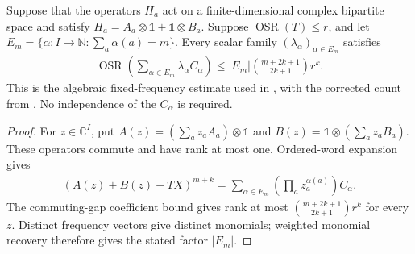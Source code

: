 \begin{theorem}
    \label{thm:one_marker_weighted_rank}
    \leanok
    Suppose that the operators $H_a$ act on a finite-dimensional complex
    bipartite space and satisfy
    $H_a=A_a\otimes\mathbb 1+\mathbb 1\otimes B_a$.
    Suppose $\operatorname{OSR}(T)\le r$, and let
    $E_m=\{\alpha:I\to\mathbb N:\sum_a\alpha(a)=m\}$.
    Every scalar family $(\lambda_\alpha)_{\alpha\in E_m}$ satisfies
    \begin{align*}
        \operatorname{OSR}\!\left(\sum_{\alpha\in E_m}\lambda_\alpha C_\alpha\right)
        \le |E_m|\binom{m+2k+1}{2k+1}r^k.
    \end{align*}
    This is the algebraic fixed-frequency estimate used in
    \cite[Lemma~4.2]{Arad2013AreaLaw}, with the corrected count from
    \cite{gap:aklv13_interpolation_and_word_count}.
    No independence of the $C_\alpha$ is required.
\end{theorem}
\begin{proof}
    \leanok
    For $z\in\mathbb C^I$, put
    $A(z)=(\sum_a z_aA_a)\otimes\mathbb 1$ and
    $B(z)=\mathbb 1\otimes(\sum_a z_aB_a)$.
    These operators commute and have rank at most one. Ordered-word expansion gives
    \begin{align*}
        [X^k](A(z)+B(z)+TX)^{m+k}
        =\sum_{\alpha\in E_m}\left(\prod_a z_a^{\alpha(a)}\right)C_\alpha.
    \end{align*}
    The commuting-gap coefficient bound gives rank at most
    $\binom{m+2k+1}{2k+1}r^k$ for every $z$.
    Distinct frequency vectors give distinct monomials; weighted monomial recovery
    therefore gives the stated factor $|E_m|$.
\end{proof}


